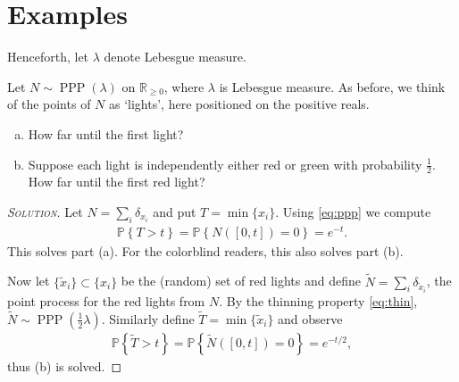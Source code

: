 \documentclass[11pt]{article}
\newenvironment{soln}{\begin{proof}[\textsc{Solution}]}{\renewcommand{\qedsymbol}{$\blacklozenge$}\end{proof}}
\begin{document}
\section{Examples}
Henceforth, let $\lambda$ denote Lebesgue measure.
\begin{example}
	Let $N\sim \operatorname{PPP}(\lambda)$ on $\mathbb{R}_{\geq 0}$, where $\lambda$ is Lebesgue measure. As before, we think of the points of $N$ as `lights', here positioned on the positive reals.
	\begin{enumerate}[(a)]
		\item How far until the first light?
		\item Suppose each light is independently either red or green with probability $\frac{1}{2}$. How far until the first red light?
	\end{enumerate}
	\begin{soln}
		Let $N = \sum_i \delta_{x_i}$ and put $T = \min\{x_i\}$. Using \eqref{eq:ppp} we compute
		\begin{align}
			\mathbb{P}\left\{ T > t \right\} = \mathbb{P}\left\{ N([0,t]) = 0 \right\} = e^{-t}.
		\end{align}
		This solves part (a). For the colorblind readers, this also solves part (b). 
		
		Now let $\{\tilde{x}_i\}\subset \{x_i\}$ be the (random) set of red lights and define $\widetilde{N} = \sum_i \delta_{\tilde{x}_i}$, the point process for the red lights from $N$. By the thinning property \eqref{eq:thin}, $\widetilde{N} \sim \operatorname{PPP}\left(\frac{1}{2}\lambda\right)$. Similarly define $\widetilde{T} = \min\{\tilde{x}_i\}$ and observe
		\begin{align}
			\mathbb{P}\left\{ \widetilde{T} > t\right\} = \mathbb{P}\left\{ \widetilde{N}([0,t]) = 0 \right\} = e^{-t/2},
		\end{align}
		thus (b) is solved.
	\end{soln}
\end{example}
\end{document}
